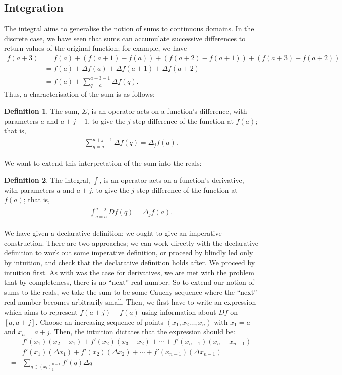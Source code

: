 \documentclass{article}
\theoremstyle{definition}
\newtheorem{defn}{Definition}[subsubsection]
\begin{document}
\subsection{Integration}
The integral aims to generalise the notion of sums to continuous domains. In the discrete case, we have seen that sums can accumulate successive differences to return values of the original function; for example, we have
\begin{align*}
	f(a+3)&=f(a)+(f(a+1)-f(a))+(f(a+2)-f(a+1))+(f(a+3)-f(a+2))\\
	&=f(a)+\Delta f(a)+\Delta f(a+1)+\Delta f(a+2)\\
	&=f(a)+\sum_{q=a}^{a+3-1}\Delta f(q).
\end{align*}
Thus, a characterisation of the sum is as follows:
\begin{defn}
	The sum, $\Sigma$, is an operator acts on a function's difference, with parameters $a$ and $a+j-1$, to give the $j$-step difference of the function at $f(a)$; that is,
	\begin{align*}
		\sum_{q=a}^{a+j-1}\Delta f(q)=\Delta_jf(a).
	\end{align*}
\end{defn}
We want to extend this interpretation of the sum into the reals:
\begin{defn}
	The integral, $\int$, is an operator acts on a function's derivative, with parameters $a$ and $a+j$, to give the $j$-step difference of the function at $f(a)$; that is,
	\begin{align*}
		\int_{q=a}^{a+j}Df(q)=\Delta_jf(a).
	\end{align*}
\end{defn}
We have given a declarative definition; we ought to give an imperative construction. There are two approaches; we can work directly with the declarative definition to work out some imperative definition, or proceed by blindly led only by intuition, and check that the declarative definition holds after. We proceed by intuition first.
As with was the case for derivatives, we are met with the problem that by completeness, there is no ``next'' real number. So to extend our notion of sums to the reals, we take the sum to be some Cauchy sequence where the ``next'' real number becomes arbitrarily small. Then, we first have to write an expression which aims to represent $f(a+j)-f(a)$ using information about $Df$ on $[a,a+j]$. Choose an increasing sequence of points $(x_1,x_2\dots,x_n)$ with $x_1=a$ and $x_n=a+j$. Then, the intuition dictates that the expression should be:
\begin{align*}
	&f'(x_1)(x_2-x_1)+f'(x_2)(x_3-x_2)+\cdots+f'(x_{n-1})(x_n-x_{n-1})\\
	=&f'(x_1)(\Delta x_1)+f'(x_2)(\Delta x_2)+\cdots+f'(x_{n-1})(\Delta x_{n-1})\\
	=&\sum_{q\in(x_i)_1^{n-1}}f'(q)\Delta q
\end{align*}
\end{document}
